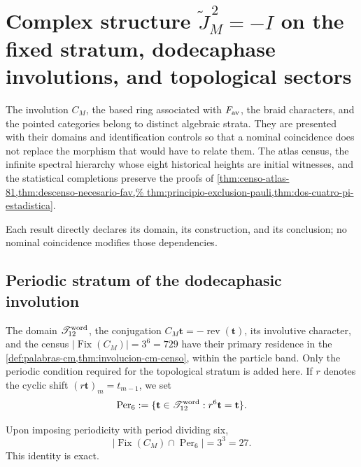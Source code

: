 \chapter[Complex structure \texorpdfstring{\(\widetilde J_M^{\,2}=-I\)}{J M squared = -I} and topological sectors]
{Complex structure \texorpdfstring{\(\widetilde J_M^{\,2}=-I\)}{J M squared = -I} on the fixed stratum, dodecaphase involutions, and topological sectors}
\label{chap:sectores-topologicos-no-omision}

The involution \(C_M\), the based ring associated with \(F_{\rm av}\), the
braid characters, and the pointed categories belong to distinct
algebraic strata. They are presented with their domains and identification
controls so that a nominal coincidence does not replace the morphism that
would have to relate them. The atlas census, the infinite spectral hierarchy
whose eight historical heights are initial witnesses, and the statistical
completions preserve the proofs of
\cref{thm:censo-atlas-81,thm:descenso-necesario-fav,%
thm:principio-exclusion-pauli,thm:dos-cuatro-pi-estadistica}.

Each result directly declares its domain, its construction, and its
conclusion; no nominal coincidence modifies those dependencies.

\section{Periodic stratum of the dodecaphasic involution}
\label{sec:involucion-cm-censo}

The domain \(\mathscr T_{12}^{\rm word}\), the conjugation
\(C_M\mathbf t=-\operatorname{rev}(\mathbf t)\), its involutive character, and the
census \(\lvert\operatorname{Fix}(C_M)\rvert=3^6=729\) have their primary residence
in the
\cref{def:palabras-cm,thm:involucion-cm-censo}, within the particle band.
Only the periodic condition required for the topological stratum is added here. If \(r\) denotes the cyclic shift
\((r\mathbf t)_m=t_{m-1}\), we set
\[
 \operatorname{Per}_6
 :=\{\mathbf t\in\mathscr T_{12}^{\rm word}:r^6\mathbf t=\mathbf t\}.
\]

\begin{proposition}
\label{prop:estrato-periodico-cm-rev7}
Upon imposing periodicity with period dividing six,
\[
 \bigl|\operatorname{Fix}(C_M)\cap\operatorname{Per}_6\bigr|
 =3^3=27.
\]
This identity is exact.
\end{proposition}

